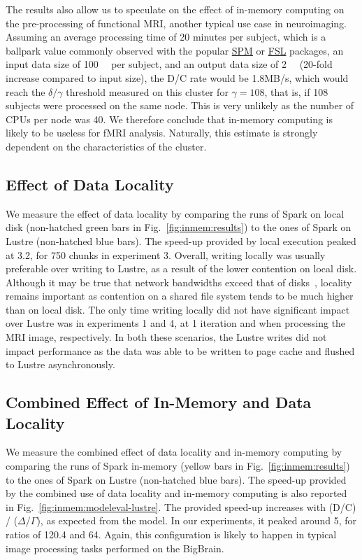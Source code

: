 The results also allow us to speculate on the effect of in-memory computing on
the pre-processing of functional MRI, another typical use case in neuroimaging.
Assuming an average processing time of 20 minutes per subject, which is a
ballpark value commonly observed with the popular
\href{https://www.fil.ion.ucl.ac.uk/spm/}{SPM} or
\href{https://fsl.fmrib.ox.ac.uk/fsl/fslwiki/}{FSL} packages, an input data size
of \SI{100}{\mega\byte} per subject, and an output data size of \SI{2}{\giga\byte} (20-fold increase compared
to input size), the D/C rate would be 1.8MB/s, which would reach the
$\delta/\gamma$ threshold measured on this cluster for $\gamma=108$, that is, if
108 subjects were processed on the same node. This is very unlikely as the
number of CPUs per node was 40. We therefore conclude that in-memory computing
is likely to be useless for fMRI analysis. Naturally, this estimate is strongly
dependent on the characteristics of the cluster.

\subsection{Effect of Data Locality}

We measure the effect of data locality by comparing the runs of Spark on local
disk (non-hatched green bars in Fig.~\ref{fig:inmem:results}) to the ones of Spark on
Lustre (non-hatched blue bars). The speed-up provided by local execution peaked
at 3.2, for 750 chunks in experiment 3. Overall, writing locally was usually
preferable over writing to Lustre, as a result of the lower contention on local
disk. Although it may be true that network bandwidths exceed that of
disks~\cite{ananthanarayanan2011disk}, locality remains important as contention
on a shared file system tends to be much higher than on local disk. The only time
writing locally did not have significant impact over Lustre was in experiments 1
and 4, at 1 iteration and when processing the MRI image, respectively. In both
these scenarios, the Lustre writes did not impact performance as the data was
able to be written to page cache and flushed to Lustre asynchronously.

\subsection{Combined Effect of In-Memory and Data Locality}
We measure the combined effect of data locality and in-memory computing by
comparing the runs of Spark in-memory (yellow bars in Fig.~\ref{fig:inmem:results}) to
the ones of Spark on Lustre (non-hatched blue bars). The speed-up provided by
the combined use of data locality and in-memory computing is also reported in
Fig.~\ref{fig:inmem:modeleval-lustre}. The provided speed-up increases with (D/C) /
($\Delta$/$\Gamma$), as expected from the model. In our experiments, it peaked
around 5, for ratios of 120.4 and 64. Again, this configuration is likely to
happen in typical image processing tasks performed on the BigBrain.


